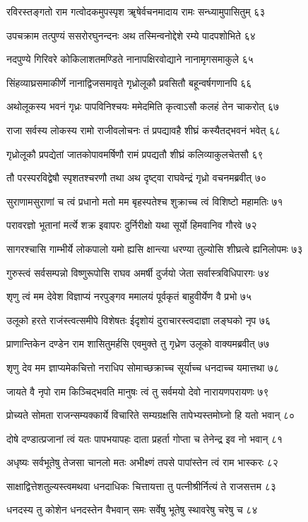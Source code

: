 रविरस्तङ्गतो राम गत्वोदकमुपस्पृश
ॠषेर्वचनमादाय रामः सन्ध्यामुपासितुम् ६३

उपचक्राम तत्पुण्यं ससरोरघुनन्दनः
अथ तस्मिन्वनोद्देशे रम्ये पादपशोभिते ६४

नदपुण्ये गिरिवरे कोकिलाशतमण्डिते
नानापक्षिरवोद्याने नानामृगसमाकुले ६५

सिंहव्याघ्रसमाकीर्णे नानाद्विजसमावृते
गृध्रोलूकौ प्रवसितौ बहून्वर्षगणानपि ६६

अथोलूकस्य भवनं गृध्रः पापविनिश्चयः
ममेदमिति कृत्वाऽसौ कलहं तेन चाकरोत् ६७

राजा सर्वस्य लोकस्य रामो राजीवलोचनः
तं प्रपद्यावहै शीघ्रं कस्यैतद्भवनं भवेत् ६८

गृध्रोलूकौ प्रपद्येतां जातकोपावमर्षिणौ
रामं प्रपद्यतौ शीघ्रं कलिव्याकुलचेतसौ ६९

तौ परस्परविद्वेषौ स्पृशतश्चरणौ तथा
अथ दृष्ट्वा राघवेन्द्रं गृध्रो वचनमब्रवीत् ७०

सुराणामसुराणां च त्वं प्रधानो मतो मम
बृहस्पतेश्च शुक्राच्च त्वं विशिष्टो महामतिः ७१

परावरज्ञो भूतानां मर्त्ये शक्र इवापरः
दुर्निरीक्षो यथा सूर्यो हिमवानिव गौरवे ७२

सागरश्चासि गाम्भीर्ये लोकपालो यमो ह्यसि
क्षान्त्या धरण्या तुल्योसि शीघ्रत्वे ह्यनिलोपमः ७३

गुरुस्त्वं सर्वसम्पन्नो विष्णुरूपोसि राघव
अमर्षी दुर्जयो जेता सर्वास्त्रविधिपारगः ७४

शृणु त्वं मम देवेश विज्ञाप्यं नरपुङ्गव
ममालयं पूर्वकृतं बाहुवीर्येण वै प्रभो ७५

उलूको हरते राजंस्त्वत्समीपे विशेषतः
ईदृशोयं दुराचारस्त्वदाज्ञा लङ्घको नृप ७६

प्राणान्तिकेन दण्डेन राम शासितुमर्हसि
एवमुक्ते तु गृध्रेण उलूको वाक्यमब्रवीत् ७७

शृणु देव मम ज्ञाप्यमेकचित्तो नराधिप
सोमाच्छक्राच्च सूर्याच्च धनदाच्च यमात्तथा ७८

जायते वै नृपो राम किञ्चिद्भवति मानुषः
त्वं तु सर्वमयो देवो नारायणपरायणः ७९

प्रोच्यते सोमता राजन्सम्यक्कार्ये विचारिते
सम्यग्रक्षसि तापेभ्यस्तमोघ्नो हि यतो भवान् ८०

दोषे दण्डात्प्रजानां त्वं यतः पापभयापहः
दाता प्रहर्ता गोप्ता च तेनेन्द्र इव नो भवान् ८१

अधृष्यः सर्वभूतेषु तेजसा चानलो मतः
अभीक्ष्णं तपसे पापांस्तेन त्वं राम भास्करः ८२

साक्षाद्वित्तेशतुल्यस्त्वमथवा धनदाधिकः
चित्तायत्ता तु पत्नीश्रीर्नित्यं ते राजसत्तम ८३

धनदस्य तु कोशेन धनदस्तेन वैभवान्
समः सर्वेषु भूतेषु स्थावरेषु चरेषु च ८४


